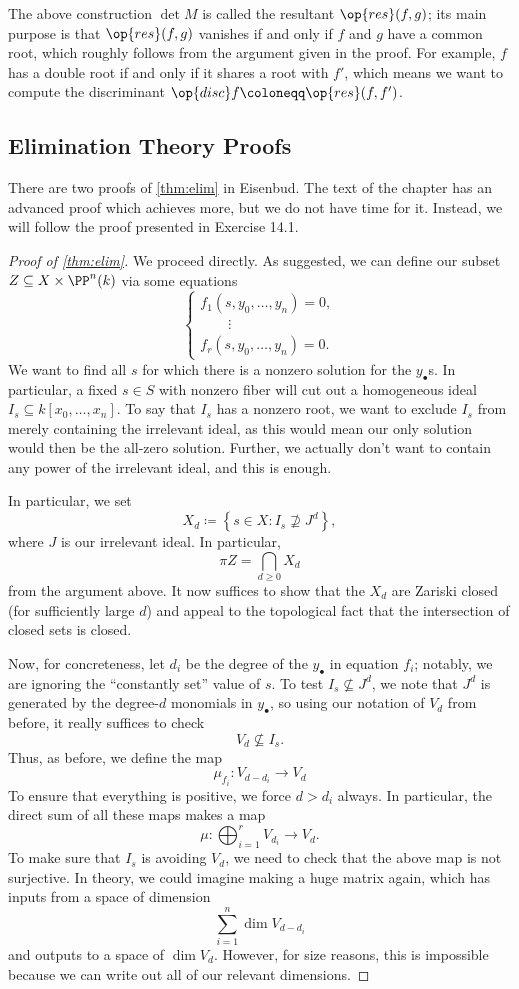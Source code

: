 \begin{remark}
	The above construction $\det M$ is called the resultant $\op{res}(f,g)$; its main purpose is that $\op{res}(f,g)$ vanishes if and only if $f$ and $g$ have a common root, which roughly follows from the argument given in the proof. For example, $f$ has a double root if and only if it shares a root with $f'$, which means we want to compute the discriminant $\op{disc}f\coloneqq\op{res}(f,f')$.
\end{remark}

\subsection{Elimination Theory Proofs}
There are two proofs of \autoref{thm:elim} in Eisenbud. The text of the chapter has an advanced proof which achieves more, but we do not have time for it. Instead, we will follow the proof presented in Exercise 14.1.
\begin{proof}[Proof of \autoref{thm:elim}]
	We proceed directly. As suggested, we can define our subset $Z\subseteq X\times\PP^n(k)$ via some equations
	\[\begin{cases}
		f_1(s,y_0,\ldots,y_n)=0, \\
		\quad\quad\vdots \\
		f_r(s,y_0,\ldots,y_n)=0.
	\end{cases}\]
	We want to find all $s$ for which there is a nonzero solution for the $y_\bullet$s. In particular, a fixed $s\in S$ with nonzero fiber will cut out a homogeneous ideal $I_s\subseteq k[x_0,\ldots,x_n]$. To say that $I_s$ has a nonzero root, we want to exclude $I_s$ from merely containing the irrelevant ideal, as this would mean our only solution would then be the all-zero solution. Further, we actually don't want to contain any power of the irrelevant ideal, and this is enough.

	In particular, we set
	\[X_d\coloneqq\left\{s\in X:I_s\not\supseteq J^d\right\},\]
	where $J$ is our irrelevant ideal. In particular,
	\[\pi Z=\bigcap_{d\ge0}X_d\]
	from the argument above. It now suffices to show that the $X_d$ are Zariski closed (for sufficiently large $d$) and appeal to the topological fact that the intersection of closed sets is closed.

	Now, for concreteness, let $d_i$ be the degree of the $y_\bullet$ in equation $f_i$; notably, we are ignoring the ``constantly set'' value of $s$. To test $I_s\not\subseteq J^d$, we note that $J^d$ is generated by the degree-$d$ monomials in $y_\bullet$, so using our notation of $V_d$ from before, it really suffices to check
	\[V_d\not\subseteq I_s.\]
	Thus, as before, we define the map
	\[\mu_{f_i}\colon V_{d-d_i}\to V_d\]
	To ensure that everything is positive, we force $d>d_i$ always. In particular, the direct sum of all these maps makes a map
	\[\mu\colon\bigoplus_{i=1}^rV_{d_i}\to V_d.\]
	To make sure that $I_s$ is avoiding $V_d$, we need to check that the above map is not surjective. In theory, we could imagine making a huge matrix again, which has inputs from a space of dimension
	\[\sum_{i=1}^n\dim V_{d-d_i}\]
	and outputs to a space of $\dim V_d$. However, for size reasons, this is impossible because we can write out all of our relevant dimensions.
\end{proof}
